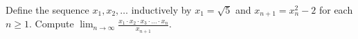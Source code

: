 Define the sequence \(x_1, x_2, \dots\) inductively by \(x_1 = \sqrt{5}\) and \(x_{n+1} = x_n^2 - 2\) for each \(n \geq 1\). Compute
\(\lim_{n \to \infty} \frac{x_1 \cdot x_2 \cdot x_3 \cdot \dots \cdot x_n}{x_{n+1}}\).